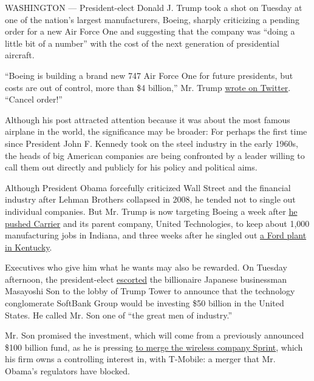 WASHINGTON --- President-elect Donald J. Trump took a shot on Tuesday at
one of the nation's largest manufacturers, Boeing, sharply criticizing a
pending order for a new Air Force One and suggesting that the company
was ``doing a little bit of a number'' with the cost of the next
generation of presidential aircraft.

``Boeing is building a brand new 747 Air Force One for future
presidents, but costs are out of control, more than \$4 billion,'' Mr.
Trump
\href{https://twitter.com/realDonaldTrump/status/806134244384899072}{wrote
on Twitter}. ``Cancel order!''

Although his post attracted attention because it was about the most
famous airplane in the world, the significance may be broader: For
perhaps the first time since President John F. Kennedy took on the steel
industry in the early 1960s, the heads of big American companies are
being confronted by a leader willing to call them out directly and
publicly for his policy and political aims.

Although President Obama forcefully criticized Wall Street and the
financial industry after Lehman Brothers collapsed in 2008, he tended
not to single out individual companies. But Mr. Trump is now targeting
Boeing a week after
\href{http://www.nytimes3xbfgragh.onion/2016/11/29/business/trump-to-announce-carrier-plant-will-keep-jobs-in-us.html}{he
pushed Carrier} and its parent company, United Technologies, to keep
about 1,000 manufacturing jobs in Indiana, and three weeks after he
singled out
\href{http://www.nytimes3xbfgragh.onion/2016/11/18/us/politics/donald-trump-takes-credit-for-helping-to-save-a-ford-plant-that-wasnt-closing.html}{a
Ford plant in Kentucky}.

Executives who give him what he wants may also be rewarded. On Tuesday
afternoon, the president-elect
\href{http://www.nytimes3xbfgragh.onion/2016/12/04/business/dealbook/masayoshi-son-softbank-mobile.html}{escorted}
the billionaire Japanese businessman Masayoshi Son to the lobby of Trump
Tower to announce that the technology conglomerate SoftBank Group would
be investing \$50 billion in the United States. He called Mr. Son one of
``the great men of industry.''

Mr. Son promised the investment, which will come from a previously
announced \$100 billion fund, as he is pressing
\href{http://dealbook.nytimes3xbfgragh.onion/2014/08/05/sprint-and-softbank-said-to-abandon-bid-for-t-mobile-us/}{to
merge the wireless company Sprint}, which his firm owns a controlling
interest in, with T-Mobile: a merger that Mr. Obama's regulators have
blocked.

